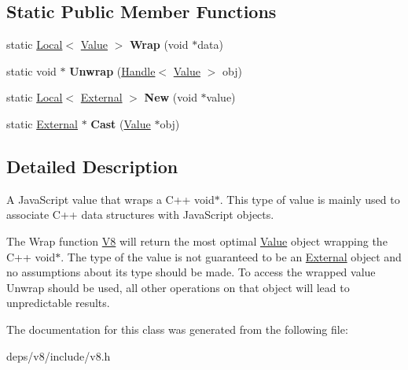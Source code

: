 \subsection*{Static Public Member Functions}
\begin{DoxyCompactItemize}
\item 
\hypertarget{classv8_1_1_external_a37e84dd3b25e19c3b39f1e1118fcdca9}{}static \hyperlink{classv8_1_1_local}{Local}$<$ \hyperlink{classv8_1_1_value}{Value} $>$ {\bfseries Wrap} (void $\ast$data)\label{classv8_1_1_external_a37e84dd3b25e19c3b39f1e1118fcdca9}

\item 
\hypertarget{classv8_1_1_external_a557d54e1d39bcfd6dc8e77ef4bbcdad7}{}static void $\ast$ {\bfseries Unwrap} (\hyperlink{classv8_1_1_handle}{Handle}$<$ \hyperlink{classv8_1_1_value}{Value} $>$ obj)\label{classv8_1_1_external_a557d54e1d39bcfd6dc8e77ef4bbcdad7}

\item 
\hypertarget{classv8_1_1_external_ac870380e98927cd1e90551d7e47b8713}{}static \hyperlink{classv8_1_1_local}{Local}$<$ \hyperlink{classv8_1_1_external}{External} $>$ {\bfseries New} (void $\ast$value)\label{classv8_1_1_external_ac870380e98927cd1e90551d7e47b8713}

\item 
\hypertarget{classv8_1_1_external_ada65769b18f901a8356522dcc2031660}{}static \hyperlink{classv8_1_1_external}{External} $\ast$ {\bfseries Cast} (\hyperlink{classv8_1_1_value}{Value} $\ast$obj)\label{classv8_1_1_external_ada65769b18f901a8356522dcc2031660}

\end{DoxyCompactItemize}


\subsection{Detailed Description}
A Java\+Script value that wraps a C++ void$\ast$. This type of value is mainly used to associate C++ data structures with Java\+Script objects.

The Wrap function \hyperlink{classv8_1_1_v8}{V8} will return the most optimal \hyperlink{classv8_1_1_value}{Value} object wrapping the C++ void$\ast$. The type of the value is not guaranteed to be an \hyperlink{classv8_1_1_external}{External} object and no assumptions about its type should be made. To access the wrapped value Unwrap should be used, all other operations on that object will lead to unpredictable results. 

The documentation for this class was generated from the following file\+:\begin{DoxyCompactItemize}
\item 
deps/v8/include/v8.\+h\end{DoxyCompactItemize}
